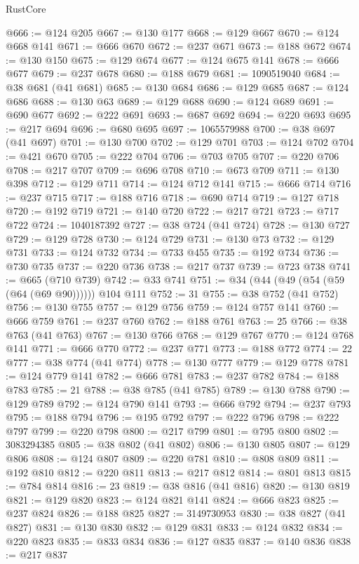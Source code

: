 \begin{lexlean}{RustCore}
\begin{coremodule}
@666 := @124 @205
@667 := @130 @177
@668 := @129 @667
@670 := @124 @668 @141
@671 := @666 @670
@672 := @237 @671
@673 := @188 @672
@674 := @130 @150
@675 := @129 @674
@677 := @124 @675 @141
@678 := @666 @677
@679 := @237 @678
@680 := @188 @679
@681 := 1090519040
@684 := @38 @681 (@41 @681)
@685 := @130 @684
@686 := @129 @685
@687 := @124 @686
@688 := @130 @63
@689 := @129 @688
@690 := @124 @689
@691 := @690 @677
@692 := @222 @691
@693 := @687 @692
@694 := @220 @693
@695 := @217 @694
@696 := @680 @695
@697 := 1065579988
@700 := @38 @697 (@41 @697)
@701 := @130 @700
@702 := @129 @701
@703 := @124 @702
@704 := @421 @670
@705 := @222 @704
@706 := @703 @705
@707 := @220 @706
@708 := @217 @707
@709 := @696 @708
@710 := @673 @709
@711 := @130 @398
@712 := @129 @711
@714 := @124 @712 @141
@715 := @666 @714
@716 := @237 @715
@717 := @188 @716
@718 := @690 @714
@719 := @127 @718
@720 := @192 @719
@721 := @140 @720
@722 := @217 @721
@723 := @717 @722
@724 := 1040187392
@727 := @38 @724 (@41 @724)
@728 := @130 @727
@729 := @129 @728
@730 := @124 @729
@731 := @130 @73
@732 := @129 @731
@733 := @124 @732
@734 := @733 @455
@735 := @192 @734
@736 := @730 @735
@737 := @220 @736
@738 := @217 @737
@739 := @723 @738
@741 := @665 (@710 @739)
@742 := @33 @741
@751 := @34 (@44 (@49 (@54 (@59 (@64 (@69 @90)))))) @104 @111
@752 := 31
@755 := @38 @752 (@41 @752)
@756 := @130 @755
@757 := @129 @756
@759 := @124 @757 @141
@760 := @666 @759
@761 := @237 @760
@762 := @188 @761
@763 := 25
@766 := @38 @763 (@41 @763)
@767 := @130 @766
@768 := @129 @767
@770 := @124 @768 @141
@771 := @666 @770
@772 := @237 @771
@773 := @188 @772
@774 := 22
@777 := @38 @774 (@41 @774)
@778 := @130 @777
@779 := @129 @778
@781 := @124 @779 @141
@782 := @666 @781
@783 := @237 @782
@784 := @188 @783
@785 := 21
@788 := @38 @785 (@41 @785)
@789 := @130 @788
@790 := @129 @789
@792 := @124 @790 @141
@793 := @666 @792
@794 := @237 @793
@795 := @188 @794
@796 := @195 @792
@797 := @222 @796
@798 := @222 @797
@799 := @220 @798
@800 := @217 @799
@801 := @795 @800
@802 := 3083294385
@805 := @38 @802 (@41 @802)
@806 := @130 @805
@807 := @129 @806
@808 := @124 @807
@809 := @220 @781
@810 := @808 @809
@811 := @192 @810
@812 := @220 @811
@813 := @217 @812
@814 := @801 @813
@815 := @784 @814
@816 := 23
@819 := @38 @816 (@41 @816)
@820 := @130 @819
@821 := @129 @820
@823 := @124 @821 @141
@824 := @666 @823
@825 := @237 @824
@826 := @188 @825
@827 := 3149730953
@830 := @38 @827 (@41 @827)
@831 := @130 @830
@832 := @129 @831
@833 := @124 @832
@834 := @220 @823
@835 := @833 @834
@836 := @127 @835
@837 := @140 @836
@838 := @217 @837

\end{coremodule}
\end{lexlean}
